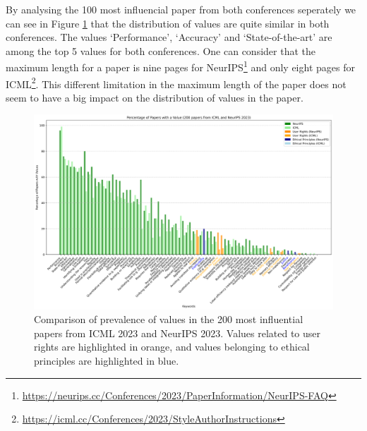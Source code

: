 \documentclass{article}
\begin{document}
By analysing the 100 most influencial paper from both conferences seperately we can see in Figure \ref{fig:percentage_comparison_conferences}
that the distribution of values are quite similar in both conferences. The values `Performance', `Accuracy' and `State-of-the-art' are among the top 5 values for both conferences. 
One can consider that the maximum length for a paper is nine pages for NeurIPS\footnote{\url{https://neurips.cc/Conferences/2023/PaperInformation/NeurIPS-FAQ}} and only eight pages for ICML\footnote{\url{https://icml.cc/Conferences/2023/StyleAuthorInstructions}}.
This different limitation in the maximum length of the paper does not seem to have a big impact on the distribution of values in the paper.
\begin{figure}[H]
    \centering
    \includegraphics[width=\textwidth]{../plots/percentage_comparison_conferences.png}
    \caption{Comparison of prevalence of values in the 200 most influential papers from ICML 2023 and NeurIPS 2023. Values related to user rights are highlighted in orange, and values belonging to ethical principles are highlighted in blue.}
    \label{fig:percentage_comparison_conferences}
\end{figure}
\end{document}
